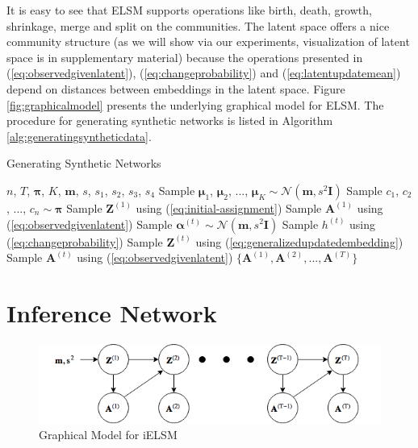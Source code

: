 \documentclass[letterpaper]{article}
\begin{document}
It is easy to see that ELSM supports operations like birth, death, growth, shrinkage, merge and split on the communities. The latent space offers a nice community structure (as we will show via our experiments, visualization of latent space is in supplementary material) because the operations presented in (\ref{eq:observedgivenlatent}), (\ref{eq:changeprobability}) and (\ref{eq:latentupdatemean}) depend on distances between embeddings in the latent space. Figure \ref{fig:graphicalmodel} presents the underlying graphical model for ELSM. The procedure for generating synthetic networks is listed in Algorithm \ref{alg:generatingsyntheticdata}.

\begin{algorithm}[tb]
   \caption{Generating Synthetic Networks}
   \label{alg:generatingsyntheticdata}
\begin{algorithmic}
    ${n}$, ${T}$, $\mathbf{\pi}$, ${K}$, $\mathbf{m}$, ${s}$, ${s_1}$, ${s_2}$, ${s_3}$, ${s_4}$
   \STATE Sample $\bm{\mu}_1$, $\bm{\mu}_2$, ..., $\bm{\mu}_K \sim \mathcal{N}(\mathbf{m}, {s^2}\mathbf{I})$
   \STATE Sample ${c_1}$, ${c_2}$, ..., ${c_n} \sim \mathbf{\pi}$
   \STATE Sample $\mathbf{Z}^{(1)}$ using (\ref{eq:initial-assignment})
   \STATE Sample $\mathbf{A}^{(1)}$ using (\ref{eq:observedgivenlatent})
        \STATE Sample $\bm{\alpha}^{(t)} \sim \mathcal{N}(\mathbf{m}, {s^2}\mathbf{I})$
        \STATE Sample ${h^{(t)}}$ using (\ref{eq:changeprobability})
        \STATE Sample $\mathbf{Z}^{(t)}$ using (\ref{eq:generalizedupdatedembedding})
   \STATE Sample $\mathbf{A}^{(t)}$ using (\ref{eq:observedgivenlatent})
   \ENDFOR
    $\{\mathbf{A}^{(1)}, \mathbf{A}^{(2)}, ..., \mathbf{A}^{(T)}\}$
\end{algorithmic}
\end{algorithm}


\section{Inference Network}
\label{section:inferenceinlatentevolutionmodel}

\begin{figure}
\begin{center}
\centering
\includegraphics[scale=0.35]{graphicalmodelselsm}
\caption{Graphical Model for iELSM}
\label{fig:graphicalmodelsELSM}
\end{center}
\end{figure}
\end{document}
